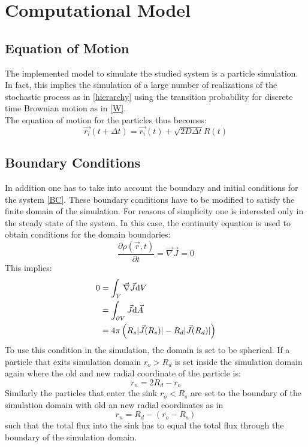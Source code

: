 \section{Computational Model}
\subsection{Equation of Motion}
The implemented model to simulate the studied system is a particle simulation. In fact, this implies the simulation of a large number of realizations of the stochastic process as in \eqref{hierarchy} using the transition probability for discrete time Brownian motion as in \eqref{W}.\\
The equation of motion for the particles thus becomes:
\begin{equation}
    \vec{r_i}(t + \Delta t) = \vec{r_i}(t) + \sqrt{2 D \Delta t}R(t)
    \label{computational eqm}
\end{equation}
\subsection{Boundary Conditions}
In addition one has to take into account the boundary and initial conditions for the system \eqref{BC}. These boundary conditions have to be modified to satisfy the finite domain of the simulation.
For reasons of simplicity one is interested only in the steady state of the system.
In this case, the continuity equation is used to obtain conditions for the domain boundaries:
\begin{equation}
    \frac{\partial \rho(\vec{r},t)}{\partial t} = \vec{\nabla} \vec{J} = 0
\end{equation}
This implies:
\begin{align}
    0   &= \int_V \vec{\nabla}\vec{J} {\rm d} V \nonumber \\
    &= \int_{\partial V} \vec{J} {\rm d} \vec{A} \nonumber \\
    &= 4 \pi \left( R_s |\vec{J}(R_s)| - R_d |\vec{J}(R_d)| \right)
\end{align}
To use this condition in the simulation, the domain is set to be spherical. If a particle that exits simulation domain $r_o > R_d$ is set inside the simulation domain again where the old and new radial coordinate of the particle is:
\begin{equation}
    r_n = 2 R_d - r_o
\end{equation}
Similarly the particles that enter the sink $r_o < R_s$ are set to the boundary of the simulation domain with old an new radial coordinates as in 
\begin{equation}
    r_n = R_d - (r_o - R_s)
\end{equation}
such that the total flux into the sink has to equal the total flux through the boundary of the simulation domain. \\
